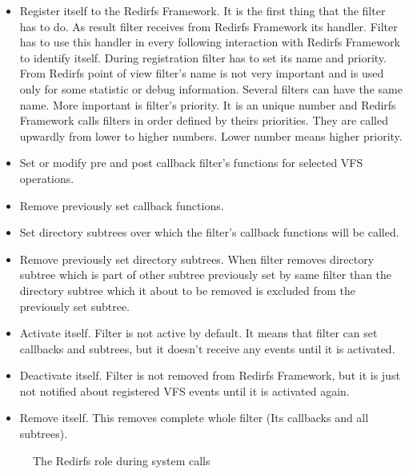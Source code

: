 \begin{itemize}
	\item Register itself to the Redirfs Framework. It is the first thing that
		the filter has to do. As result filter receives from Redirfs Framework
		its handler. Filter has to use this handler in every following
		interaction with Redirfs Framework to identify itself. During
		registration filter has to set its name and priority. From Redirfs
		point of view filter's name is not very important and is used only
		for some statistic or debug information. Several filters can have the same
		name. More important is filter's priority. It is an unique number and
		Redirfs Framework calls filters in order defined by theirs priorities.
		They are called upwardly from lower to higher numbers. Lower number
		means higher priority.

	\item Set or modify pre and post callback filter's functions for selected VFS
		operations.

	\item Remove previously set callback functions.

	\item Set directory subtrees over which the filter's callback functions will
		be called.

	\item Remove previously set directory subtrees. When filter removes directory
		subtree which is part of other subtree previously set by same filter than
		the directory subtree which it about to be removed is excluded from the
		previously set subtree.

	\item Activate itself. Filter is not active by default. It means that filter
		can set callbacks and subtrees, but it doesn't receive any events
		until it is activated.

	\item Deactivate itself. Filter is not removed from Redirfs Framework, but it
		is just not notified about registered VFS events until it is 
		activated again.

	\item Remove itself. This removes complete whole filter (Its callbacks and
		all subtrees).
\end{itemize}

\begin{figure}[hp]
	\begin{center}
		
	\end{center}
	\caption{The Redirfs role during system calls}
	\label{fig:redirfs_role}
\end{figure}

